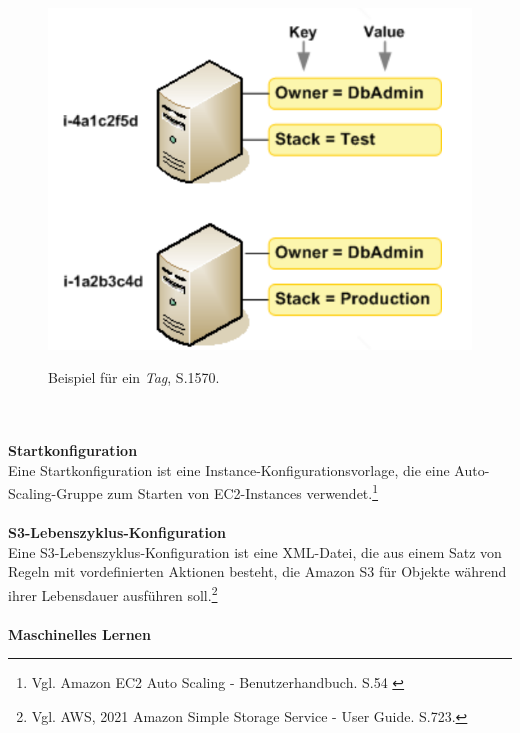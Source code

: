 \begin{figure}[h!]
  \centering
  \includegraphics[scale=0.4]{sources/TagExample}
  \caption[Beispiel für ein Tag]{}\label{fig:TagExample}
  Beispiel für ein \textit{Tag}{\cite{AMZ26}, S.1570}.
\end{figure}
\\\\
\textbf{Startkonfiguration}\\
Eine Startkonfiguration ist eine Instance-Konfigurationsvorlage, die eine Auto-Scaling-Gruppe zum Starten von EC2-Instances verwendet.\footnote{Vgl. Amazon EC2 Auto Scaling - Benutzerhandbuch. S.54 \cite{AMZ31}}
\\\\
\textbf{S3-Lebenszyklus-Konfiguration}\\
Eine S3-Lebenszyklus-Konfiguration ist eine XML-Datei, die aus einem Satz von Regeln mit vordefinierten
Aktionen besteht, die Amazon S3 für Objekte während ihrer Lebensdauer ausführen soll.\footnote{Vgl. AWS, 2021 Amazon Simple Storage Service - User Guide. S.723.\cite{AMZ18}}
\\\\
\textbf{Maschinelles Lernen}\\
